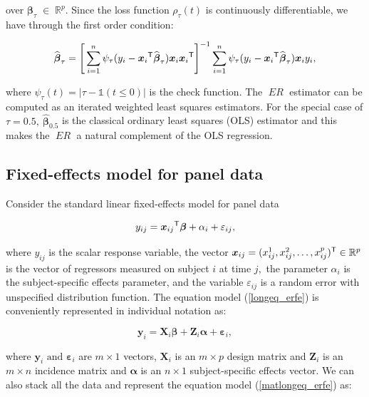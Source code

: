 \documentclass[15pt,a4paper]{article}
\newcommand{\transpose}{{}^{\text{\sffamily T}}}
\DeclareMathOperator{\ER}{\textit{ER}}
\begin{document}
over \(\boldsymbol{\beta}_{\tau}\;\in\;\mathbb{R}^p.\) Since the loss function \(\rho_\tau(t)\) is continuously differentiable, we have through the first order condition:

\begin{equation}\label{er_est_erfe}
 \widehat{\boldsymbol{\beta}}_{\tau}=\Bigg[\sum_{i=1}^{n}\psi_\tau(y_{i}-\boldsymbol{x}_i\transpose \widehat{\boldsymbol{\beta}}_{\tau})\boldsymbol{x}_i\boldsymbol{x}_i\transpose \Bigg]^{-1}
 \sum_{i=1}^{n}\psi_\tau(y_{i}-\boldsymbol{x}_i\transpose \widehat{\boldsymbol{\beta}}_{\tau}) \boldsymbol{x}_i y_i,
\end{equation}

where \(\psi_\tau(t)=\lvert \tau-\mathds{1}(t\leq 0)\rvert\) is the check function. The $\ER$ estimator can be computed as an iterated weighted least squares estimators. For the special case of \(\tau=0.5, \ \widehat{\boldsymbol{\beta}}_{0.5}\)
is the classical ordinary least squares (OLS) estimator and this makes the $\ER$ a natural complement of the OLS regression. 

\subsection{Fixed-effects model for panel data}

Consider the standard linear fixed-effects model for panel data

\begin{equation}\label{longeq_erfe}
y_{ij}=\boldsymbol{x}_{ij}\transpose\boldsymbol{\beta} + \alpha_{i} + \varepsilon_{ij},
\end{equation}

where \(y_{ij}\) is the scalar response variable, the vector \(\boldsymbol{x}_{ij}=(x_{ij}^1,x_{ij}^2, \ldots, x_{ij}^p)\transpose \in \mathbb{R}^p\) is the vector of regressors measured on subject \(i\) at time \(j,\) the parameter \(\alpha_{i}\) is the subject-specific effects parameter, and the variable \(\varepsilon_{ij}\) is a random error with unspecified distribution function. The equation model (\ref{longeq_erfe}) is conveniently represented in individual notation as:

\begin{equation}\label{matlongeq_erfe}
\boldsymbol{y}_i=\boldsymbol{X}_i\boldsymbol{\beta} + \boldsymbol{Z}_i\boldsymbol{\alpha} + \boldsymbol{\varepsilon}_i,
\end{equation}

where \(\boldsymbol{y}_i \mbox{ and } \boldsymbol{\varepsilon}_i\) are \(m \times 1\) vectors, \(\boldsymbol{X}_i\) is an \(m \times p\) design matrix and \(\boldsymbol{Z}_i\) is an \(m \times n\) incidence matrix and \(\boldsymbol{\alpha}\) is an \(n \times 1\) subject-specific effects vector. 
We can also stack all the data and represent the equation model (\ref{matlongeq_erfe}) as:
\end{document}
